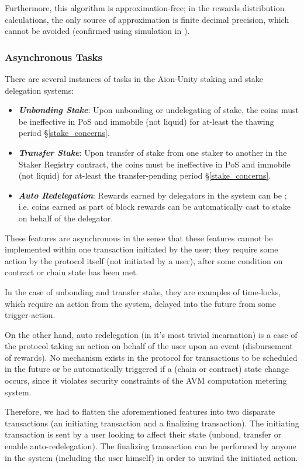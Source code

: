Furthermore, this algorithm is approximation-free; in the rewards distribution calculations, the only source of approximation is finite decimal precision, which cannot be avoided (confirmed using simulation in \cite{Sha19}).  

\subsubsection{Asynchronous Tasks}
There are several instances of  tasks in the Aion-Unity staking and stake delegation systems: 
\begin{itemize}
    \item \textit{\textbf{Unbonding Stake}}: Upon unbonding or undelegating of stake, the coins must be ineffective in PoS and immobile (not liquid) for at-least the thawing period \S\ref{stake_concerns}.  
    \item \textit{\textbf{Transfer Stake}}: Upon transfer of stake from one staker to another in the Staker Registry contract, the coins must be ineffective in PoS and immobile (not liquid) for at-least the transfer-pending period \S\ref{stake_concerns}.  
    \item \textit{\textbf{Auto Redelegation}}: Rewards earned by delegators in the system can be ; i.e. coins earned as part of block rewards can be automatically cast to stake on behalf of the delegator.  
\end{itemize}

These features are asynchronous in the sense that these features cannot be implemented within one transaction initiated by the user; they require some action by the protocol itself (not initiated by a user), after some condition on contract or chain state has been met.   

In the case of unbonding and transfer stake, they are examples of time-locks, which require an action from the system, delayed into the future from some trigger-action. 

On the other hand, auto redelegation (in it's most trivial incarnation) is a case of the protocol taking an action on behalf of the user upon an event (disbursement of rewards). 
No mechanism exists in the protocol for transactions to be scheduled in the future or be automatically triggered if a (chain or contract) state change occurs, since it violates security constraints of the AVM computation metering system. 

Therefore, we had to flatten the aforementioned features into two disparate transactions (an initiating transaction and a finalizing transaction). The initiating transaction is sent by a user looking to affect their state (unbond, transfer or enable auto-redelegation). The finalizing transaction can be performed by anyone in the system (including the user himself) in order to unwind the initiated action.

